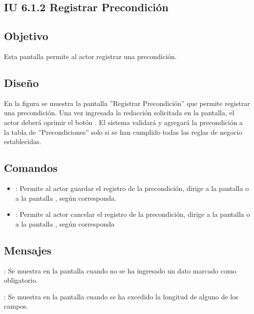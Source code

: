 \subsection{IU 6.1.2 Registrar Precondición}

\subsection{Objetivo}
	Esta pantalla permite al actor registrar una precondición.
\subsection{Diseño}
	En la figura  se muestra la pantalla ''Registrar Precondición'' que permite registrar una precondición. Una vez ingresada la redacción solicitada en la pantalla, el actor deberá oprimir el botón  . El sistema validará y agregará la precondición a la tabla de ''Precondiciones'' solo si se han cumplido todas las reglas de negocio establecidas.

\subsection{Comandos}
\begin{itemize}
	\item {}: Permite al actor guardar el registro de la precondición, dirige a la pantalla  o a la pantalla , según corresponda.
	\item {}: Permite al actor cancelar el registro de la precondición, dirige a la pantalla  o a la pantalla , según corresponda
\end{itemize}

\subsection{Mensajes}

\begin{Citemize}
	\item {}: Se muestra en la pantalla  cuando no se ha ingresado un dato marcado como obligatorio.
	\item {}: Se muestra en la pantalla  cuando se ha excedido la longitud de alguno de los campos.
\end{Citemize}
